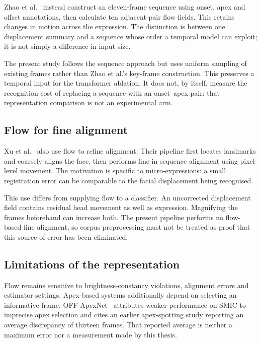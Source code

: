 Zhao et al.~\cite{zhaoS2021} instead construct an eleven-frame sequence using onset, apex and offset annotations, then calculate ten adjacent-pair flow fields. This retains changes in motion across the expression. The distinction is between one displacement summary and a sequence whose order a temporal model can exploit; it is not simply a difference in input size.

The present study follows the sequence approach but uses uniform sampling of existing frames rather than Zhao et al.'s key-frame construction. This preserves a temporal input for the transformer ablation. It does not, by itself, measure the recognition cost of replacing a sequence with an onset--apex pair: that representation comparison is not an experimental arm.

\subsection{Flow for fine alignment}
\label{sec:flow-alignment}

Xu et al.~\cite{xu2017} also use flow to refine alignment. Their pipeline first locates landmarks and coarsely aligns the face, then performs fine in-sequence alignment using pixel-level movement. The motivation is specific to micro-expressions: a small registration error can be comparable to the facial displacement being recognised.

This use differs from supplying flow to a classifier. An uncorrected displacement field contains residual head movement as well as expression. Magnifying the frames beforehand can increase both. The present pipeline performs no flow-based fine alignment, so corpus preprocessing must not be treated as proof that this source of error has been eliminated.

\subsection{Limitations of the representation}
\label{sec:flow-limitations}

Flow remains sensitive to brightness-constancy violations, alignment errors and estimator settings. Apex-based systems additionally depend on selecting an informative frame. OFF-ApexNet~\cite{liong2019a} attributes weaker performance on SMIC to imprecise apex selection and cites an earlier apex-spotting study reporting an average discrepancy of thirteen frames. That reported average is neither a maximum error nor a measurement made by this thesis.

